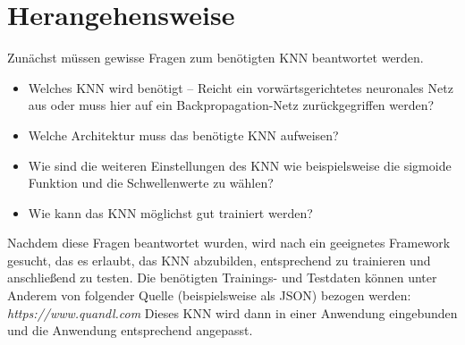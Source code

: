 \documentclass[11pt,a4paper]{article}
\begin{document}
\section{Herangehensweise}
Zunächst müssen gewisse Fragen zum benötigten KNN beantwortet werden. 
\begin{itemize}
	\item Welches KNN wird benötigt – Reicht ein vorwärtsgerichtetes neuronales Netz aus oder muss hier auf ein Backpropagation-Netz zurückgegriffen werden?
	\item Welche Architektur muss das benötigte KNN aufweisen? 
	\item Wie sind die weiteren Einstellungen des KNN wie beispielsweise die sigmoide Funktion und die Schwellenwerte zu wählen?
	\item Wie kann das KNN möglichst gut trainiert werden?
\end{itemize}
Nachdem diese Fragen beantwortet wurden, wird nach ein geeignetes Framework gesucht, das es erlaubt, das KNN abzubilden, entsprechend zu trainieren und anschließend zu testen. Die benötigten Trainings- und Testdaten können unter Anderem von folgender Quelle (beispielsweise als JSON) bezogen werden: \textit{https://www.quandl.com} Dieses KNN wird dann in einer Anwendung eingebunden und die Anwendung entsprechend angepasst.
\end{document}
